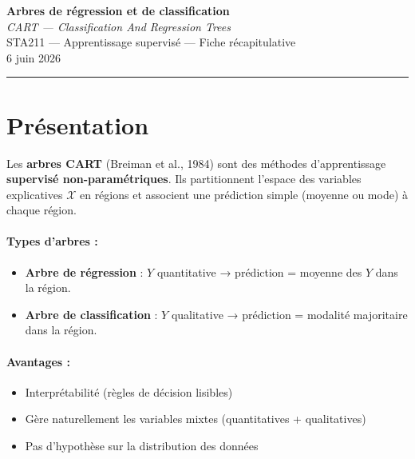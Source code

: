 \documentclass[a4paper,11pt]{article}
\begin{document}
\begin{center}
{\LARGE\textbf{Arbres de régression et de classification}} \\
\vspace{0.2cm}
{\large \textit{CART — Classification And Regression Trees}} \\
\vspace{0.3cm}
STA211 — Apprentissage supervisé — Fiche récapitulative \\
6 juin 2026
\end{center}

\vspace{0.3cm}
\rule{\textwidth}{0.4pt}
\vspace{0.3cm}

\tableofcontents
\newpage

\section{Présentation}

Les \textbf{arbres CART} (Breiman et al., 1984) sont des méthodes d'apprentissage \textbf{supervisé non-paramétriques}. Ils partitionnent l'espace des variables explicatives $\mathcal{X}$ en régions et associent une prédiction simple (moyenne ou mode) à chaque région.

\paragraph{Types d'arbres :}
\begin{itemize}
    \item \textbf{Arbre de régression} : $Y$ quantitative → prédiction = moyenne des $Y$ dans la région.
    \item \textbf{Arbre de classification} : $Y$ qualitative → prédiction = modalité majoritaire dans la région.
\end{itemize}

\paragraph{Avantages :}
\begin{itemize}
    \item Interprétabilité (règles de décision lisibles)
    \item Gère naturellement les variables mixtes (quantitatives + qualitatives)
    \item Pas d'hypothèse sur la distribution des données
\end{itemize}
\end{document}

